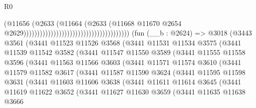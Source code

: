 \begin{lexlean}{R0}
\begin{coremodule}
                                                                        (@11656
                                                                          (@2633
                                                                            (@11664
                                                                              (@2633
                                                                                (@11668
                                                                                  @11670
                                                                                  @2654
                                                                                  @2629)))))))))))))))))))))))))))))))))))))))
    (fun (__b : @2624) =>
    @3018
      (@3443
        @3561
        (@3441
          @11523
          @11526
          @3568
          (@3441
            @11531
            @11534
            @3575
            (@3441
              @11539
              @11542
              @3582
              (@3441
                @11547
                @11550
                @3589
                (@3441
                  @11555
                  @11558
                  @3596
                  (@3441
                    @11563
                    @11566
                    @3603
                    (@3441
                      @11571
                      @11574
                      @3610
                      (@3441
                        @11579
                        @11582
                        @3617
                        (@3441
                          @11587
                          @11590
                          @3624
                          (@3441
                            @11595
                            @11598
                            @3631
                            (@3441
                              @11603
                              @11606
                              @3638
                              (@3441
                                @11611
                                @11614
                                @3645
                                (@3441
                                  @11619
                                  @11622
                                  @3652
                                  (@3441
                                    @11627
                                    @11630
                                    @3659
                                    (@3441
                                      @11635
                                      @11638
                                      @3666

\end{coremodule}
\end{lexlean}
